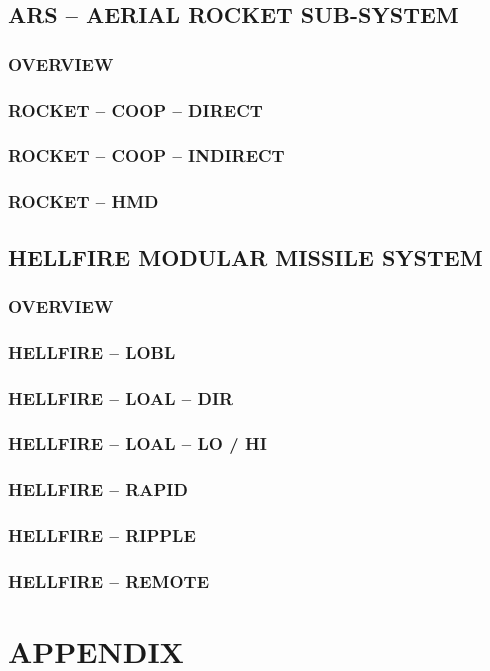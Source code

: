 \documentclass[fontHelvetica]{TechCheck}
\begin{document}
	\clearpage 

	\section{ARS -- AERIAL ROCKET SUB-SYSTEM}
	\subsection{OVERVIEW}
	\subsection{ROCKET -- COOP -- DIRECT}
	\subsection{ROCKET -- COOP -- INDIRECT}
	\subsection{ROCKET -- HMD}

	\clearpage

	\section{HELLFIRE MODULAR MISSILE SYSTEM}
	\subsection{OVERVIEW}
	\subsection{HELLFIRE -- LOBL}
	\subsection{HELLFIRE -- LOAL -- DIR}
	\subsection{HELLFIRE -- LOAL -- LO / HI}
	\subsection{HELLFIRE -- RAPID}
	\subsection{HELLFIRE -- RIPPLE}
	\subsection{HELLFIRE -- REMOTE}

	\cleardoublepage

	\chapter{APPENDIX}
	\minitoc
	\cleardoublepage



  \cleardoublepage

\iftoggle{print}{
	\pagestyle{empty}
	\newpage \null
	\thumbwide
	\newpage \null
}{}
\end{document}
